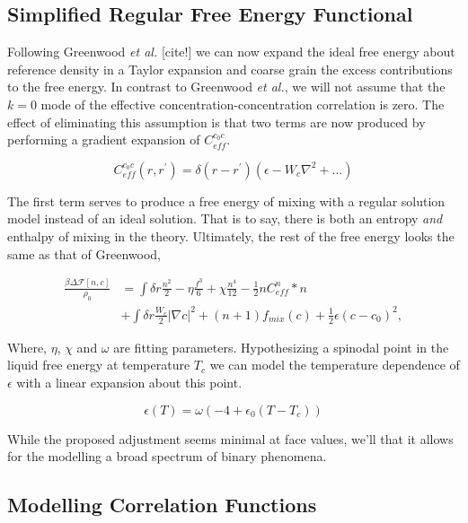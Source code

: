 \documentclass[showkeys, prb, reprint]{revtex4-1}
\newcommand{\F}{\mathcal{F}}
\renewcommand{\d}{\delta}
\renewcommand{\l}{\left}
\renewcommand{\r}{\right}
\newcommand{\f}{\frac}
\begin{document}
\subsection{Simplified Regular Free Energy Functional}

Following Greenwood \textit{et al.} [cite!] we can now expand the ideal free energy about reference density in a Taylor expansion and coarse grain the excess contributions to the free energy. In contrast to Greenwood \textit{et al.}, we will not assume that the $k = 0$ mode of the effective concentration-concentration correlation is zero. The effect of eliminating this assumption is that two terms are now produced by performing a gradient expansion of $C^{c_0c}_{eff}$.

\begin{equation}
	C^{c_0 c}_{eff}(r, r^\prime) = \delta(r - r^\prime)\l(\epsilon  - W_c \nabla^2 + ... \r)
\end{equation}

The first term serves to produce a free energy of mixing with a regular solution model instead of an ideal solution. That is to say, there is both an entropy \textit{and} enthalpy of mixing in the theory. Ultimately, the rest of the free energy looks the same as that of Greenwood,

\begin{align}
	\f{\beta \Delta \F[n, c]}{\rho_0} &= \int \d r \f{n^2}{2} - \eta \f{f^3}{6} + \chi \f{n^4}{12} -\f{1}{2} n C^{n}_{eff} \ast n \\
	&+ \int \d r \f{W_c}{2} \l\vert\nabla c\r\vert^2 + (n + 1) f_{mix}(c) + \f{1}{2} \epsilon (c- c_0)^2, \nonumber
\end{align}

Where, $\eta$, $\chi$ and $\omega$ are fitting parameters. Hypothesizing a spinodal point in the liquid free energy at temperature $T_c$ we can model the temperature dependence of $\epsilon$ with a linear expansion about this point. 

\begin{equation}
	\epsilon(T) = \omega \l( -4 + \epsilon_0 \l(T - T_c\r)\r) 
\end{equation}

While the proposed adjustment seems minimal at face values, we'll that it allows for the modelling a broad spectrum of binary phenomena.

\subsection{Modelling Correlation Functions}
\end{document}
